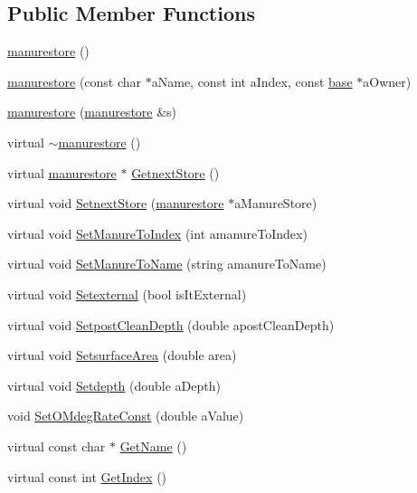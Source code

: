 \subsection*{Public Member Functions}
\begin{DoxyCompactItemize}
\item 
\hyperlink{classmanurestore_a02f7143140593b6bdcb8d78a0430eaae}{manurestore} ()
\item 
\hyperlink{classmanurestore_a4dd27dc7412d75d1b50441280aab6d88}{manurestore} (const char $\ast$aName, const int aIndex, const \hyperlink{classbase}{base} $\ast$aOwner)
\item 
\hyperlink{classmanurestore_a737792bf42c55f07092c3aed9f5330b6}{manurestore} (\hyperlink{classmanurestore}{manurestore} \&s)
\item 
virtual \hyperlink{classmanurestore_a02a248d96a0dd55d54926e44f51f253a}{$\sim$manurestore} ()
\item 
virtual \hyperlink{classmanurestore}{manurestore} $\ast$ \hyperlink{classmanurestore_a014f1b4f4dd098fc5152867eb2d7f053}{GetnextStore} ()
\item 
virtual void \hyperlink{classmanurestore_a17d1969c7d7f39b449da52d42155f342}{SetnextStore} (\hyperlink{classmanurestore}{manurestore} $\ast$aManureStore)
\item 
virtual void \hyperlink{classmanurestore_a91a0524f1b0d04fcb00e04a5d271050b}{SetManureToIndex} (int amanureToIndex)
\item 
virtual void \hyperlink{classmanurestore_a1059b3c5134aedbee070b852792a2208}{SetManureToName} (string amanureToName)
\item 
virtual void \hyperlink{classmanurestore_abffbe2e19e1d1ad114f35c532acc3f4c}{Setexternal} (bool isItExternal)
\item 
virtual void \hyperlink{classmanurestore_ad8bd234e6612ea15ea17795899615b41}{SetpostCleanDepth} (double apostCleanDepth)
\item 
virtual void \hyperlink{classmanurestore_ad6e7d11021d7b76a7f8682621403a653}{SetsurfaceArea} (double area)
\item 
virtual void \hyperlink{classmanurestore_a30eae0570a0fe584f7a4f395d96d0899}{Setdepth} (double aDepth)
\item 
void \hyperlink{classmanurestore_afad26ecb67219f60eeb0cd7c0aed89a3}{SetOMdegRateConst} (double aValue)
\item 
virtual const char $\ast$ \hyperlink{classmanurestore_a0b368f98abaed202859421df1705446c}{GetName} ()
\item 
virtual const int \hyperlink{classmanurestore_abd141ffb5bf592b32f75222527ea80a4}{GetIndex} ()

\end{DoxyCompactItemize}

